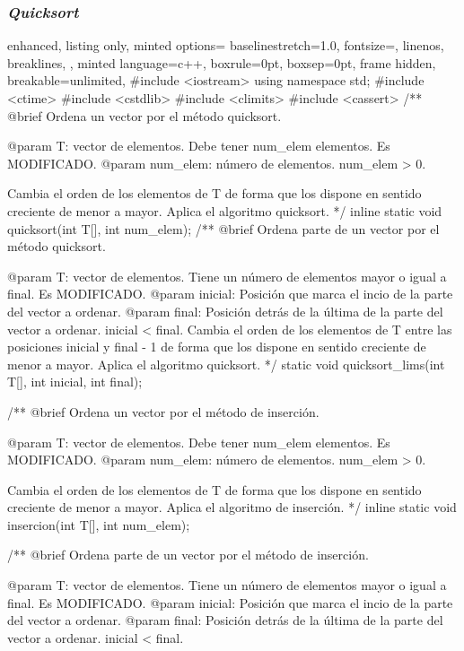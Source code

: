 \documentclass[12pt,spanish]{article}
\begin{document}
\subsubsection{\textit{Quicksort}}

\begin{multicols}{2}
\begin{tcblisting}
{
  enhanced,
  listing only,
  minted options={
    baselinestretch=1.0,
    fontsize=\footnotesize,
    linenos,
    breaklines,
  },
  minted language=c++,
  boxrule=0pt,
  boxsep=0pt,
  frame hidden,
  breakable=unlimited,
}
#include <iostream>
using namespace std;
#include <ctime>
#include <cstdlib>
#include <climits>
#include <cassert>
/**
   @brief Ordena un vector por el método quicksort.

   @param T: vector de elementos. Debe tener num_elem elementos.
             Es MODIFICADO.
   @param num_elem: número de elementos. num_elem > 0.

   Cambia el orden de los elementos de T de forma que los dispone
   en sentido creciente de menor a mayor.
   Aplica el algoritmo quicksort.
*/
inline static 
void quicksort(int T[], int num_elem);
/**
   @brief Ordena parte de un vector por el método quicksort.

   @param T: vector de elementos. Tiene un número de elementos 
                   mayor o igual a final. Es MODIFICADO.
   @param inicial: Posición que marca el incio de la parte del
                   vector a ordenar.
   @param final: Posición detrás de la última de la parte del
                   vector a ordenar. 
		   inicial < final.
   Cambia el orden de los elementos de T entre las posiciones
   inicial y final - 1 de forma que los dispone en sentido creciente
   de menor a mayor.
   Aplica el algoritmo quicksort.
*/
static void quicksort_lims(int T[], int inicial, int final);

/**
   @brief Ordena un vector por el método de inserción.

   @param T: vector de elementos. Debe tener num_elem elementos.
             Es MODIFICADO.
   @param num_elem: número de elementos. num_elem > 0.

   Cambia el orden de los elementos de T de forma que los dispone
   en sentido creciente de menor a mayor.
   Aplica el algoritmo de inserción.
*/
inline static 
void insercion(int T[], int num_elem);

/**
   @brief Ordena parte de un vector por el método de inserción.

   @param T: vector de elementos. Tiene un número de elementos 
                   mayor o igual a final. Es MODIFICADO.
   @param inicial: Posición que marca el incio de la parte del
                   vector a ordenar.
   @param final: Posición detrás de la última de la parte del
                   vector a ordenar. 
		   inicial < final.


\end{tcblisting}
\end{multicols}
\end{document}
